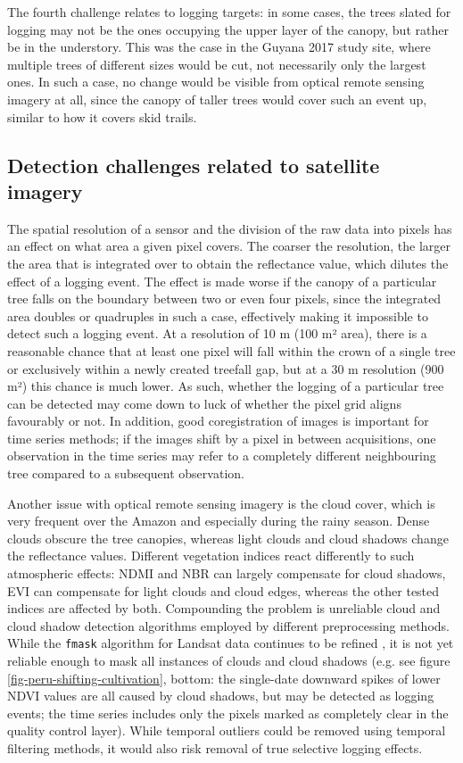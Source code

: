 \documentclass[a4paper,12pt]{scrbook}
\begin{document}
The fourth challenge relates to logging targets: in some cases, the trees slated for logging may not be the ones occupying the upper layer of the canopy, but rather be in the understory. This was the case in the Guyana 2017 study site, where multiple trees of different sizes would be cut, not necessarily only the largest ones. In such a case, no change would be visible from optical remote sensing imagery at all, since the canopy of taller trees would cover such an event up, similar to how it covers skid trails.

\subsection{Detection challenges related to satellite imagery}

The spatial resolution of a sensor and the division of the raw data into pixels has an effect on what area a given pixel covers. The coarser the resolution, the larger the area that is integrated over to obtain the reflectance value, which dilutes the effect of a logging event. The effect is made worse if the canopy of a particular tree falls on the boundary between two or even four pixels, since the integrated area doubles or quadruples in such a case, effectively making it impossible to detect such a logging event. At a resolution of 10 m (100 m² area), there is a reasonable chance that at least one pixel will fall within the crown of a single tree or exclusively within a newly created treefall gap, but at a 30 m resolution (900 m²) this chance is much lower. As such, whether the logging of a particular tree can be detected may come down to luck of whether the pixel grid aligns favourably or not. In addition, good coregistration of images is important for time series methods; if the images shift by a pixel in between acquisitions, one observation in the time series may refer to a completely different neighbouring tree compared to a subsequent observation.

Another issue with optical remote sensing imagery is the cloud cover, which is very frequent over the Amazon and especially during the rainy season. Dense clouds obscure the tree canopies, whereas light clouds and cloud shadows change the reflectance values. Different vegetation indices react differently to such atmospheric effects: \ac{NDMI} and \ac{NBR} can largely compensate for cloud shadows, \ac{EVI} can compensate for light clouds and cloud edges, whereas the other tested indices are affected by both. Compounding the problem is unreliable cloud and cloud shadow detection algorithms employed by different preprocessing methods. While the \texttt{fmask} algorithm for Landsat data continues to be refined \citep{zhu_improvement_2015, qiu_improving_2017}, it is not yet reliable enough to mask all instances of clouds and cloud shadows (e.g. see figure \ref{fig-peru-shifting-cultivation}, bottom: the single-date downward spikes of lower \ac{NDVI} values are all caused by cloud shadows, but may be detected as logging events; the time series includes only the pixels marked as completely clear in the quality control layer). While temporal outliers could be removed using temporal filtering methods, it would also risk removal of true selective logging effects.
\end{document}
